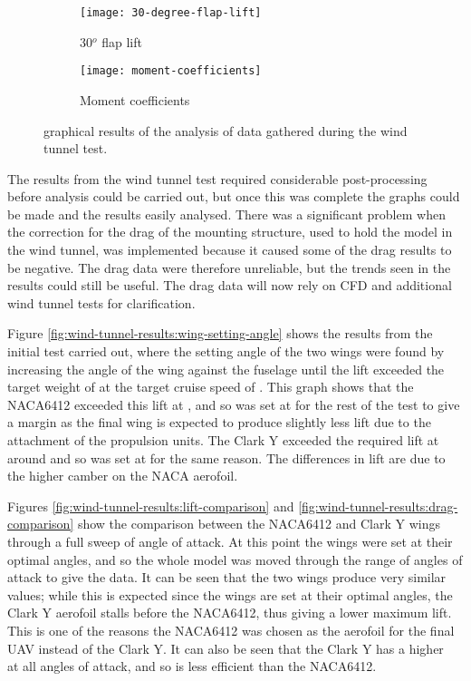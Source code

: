 \documentclass[../../main.tex]{subfiles}
\begin{document}
\begin{figure}[H]
    \begin{subfigure}[b]{0.49\columnwidth}
        \centering
        \texttt{[image: 30-degree-flap-lift]}
        \caption{30$^o$ flap lift}
        \label{fig:wind-tunnel-results:30-degree-flap-lift}
    \end{subfigure}
    \hfill
    \begin{subfigure}[b]{0.49\columnwidth}
        \centering
        \texttt{[image: moment-coefficients]}
        \caption{Moment coefficients}
        \label{fig:wind-tunnel-results:moment-coefficients}
    \end{subfigure}

    \caption{graphical results of the analysis of data gathered during the wind tunnel test.}
    \label{fig:wind-tunnel-results}
\end{figure}

The results from the wind tunnel test required considerable post-processing before analysis could be carried out, but once this was complete the graphs could be made and the results easily analysed.
There was a significant problem when the correction for the drag of the mounting structure, used to hold the model in the wind tunnel, was implemented because it caused some of the drag results to be negative.
The drag data were therefore unreliable, but the trends seen in the results could still be useful.
The drag data will now rely on CFD and additional wind tunnel tests for clarification.

Figure \ref{fig:wind-tunnel-results:wing-setting-angle} shows the results from the initial test carried out, where the setting angle of the two wings were found by increasing the angle of the wing against the fuselage until the lift exceeded the target weight of  at the target cruise speed of .
This graph shows that the NACA6412 exceeded this lift at , and so was set at  for the rest of the test to give a margin as the final wing is expected to produce slightly less lift due to the attachment of the propulsion units.
The Clark Y exceeded the required lift at around  and so was set at  for the same reason.  The differences in lift are due to the higher camber on the NACA aerofoil.

Figures \ref{fig:wind-tunnel-results:lift-comparison} and \ref{fig:wind-tunnel-results:drag-comparison} show the comparison between the NACA6412 and Clark Y wings through a full sweep of angle of attack.
At this point the wings were set at their optimal angles, and so the whole model was moved through the range of angles of attack to give the data.
It can be seen that the two wings produce very similar \cl\, values; while this is expected since the wings are set at their optimal angles, the Clark Y aerofoil stalls before the NACA6412, thus giving a lower maximum lift.
This is one of the reasons the NACA6412 was chosen as the aerofoil for the final UAV instead of the Clark Y.
It can also be seen that the Clark Y has a higher \cd\, at all angles of attack, and so is less efficient than the NACA6412.
\end{document}
